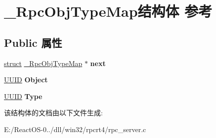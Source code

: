 \hypertarget{struct___rpc_obj_type_map}{}\section{\+\_\+\+Rpc\+Obj\+Type\+Map结构体 参考}
\label{struct___rpc_obj_type_map}
\subsection*{Public 属性}
\begin{DoxyCompactItemize}
\item 
\mbox{\label{struct___rpc_obj_type_map_a0ca280010e1159c10d3e12a4ca95b201}} 
\hyperlink{interfacestruct}{struct} \hyperlink{struct___rpc_obj_type_map}{\+\_\+\+Rpc\+Obj\+Type\+Map} $\ast$ {\bfseries next}
\item 
\mbox{\label{struct___rpc_obj_type_map_a9eeda3851dc121e2ae7db3de8dc55f0f}} 
\hyperlink{interface_g_u_i_d}{U\+U\+ID} {\bfseries Object}
\item 
\mbox{\label{struct___rpc_obj_type_map_a602c787ac5623683aa6b17f8f577a943}} 
\hyperlink{interface_g_u_i_d}{U\+U\+ID} {\bfseries Type}
\end{DoxyCompactItemize}


该结构体的文档由以下文件生成\+:\begin{DoxyCompactItemize}
\item 
E\+:/\+React\+O\+S-\/0../dll/win32/rpcrt4/rpc\+\_\+server.\+c\end{DoxyCompactItemize}
